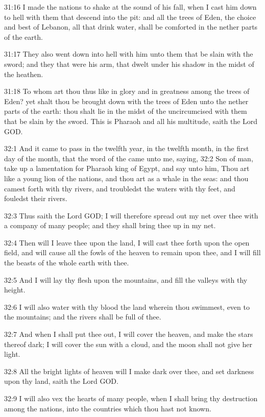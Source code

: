 31:16 I made the nations to shake at the sound of his fall, when I cast him down to hell with them that descend into the pit: and all the trees of Eden, the choice and best of Lebanon, all that drink water, shall be comforted in the nether parts of the earth.

31:17 They also went down into hell with him unto them that be slain with the sword; and they that were his arm, that dwelt under his shadow in the midst of the heathen.

31:18 To whom art thou thus like in glory and in greatness among the trees of Eden? yet shalt thou be brought down with the trees of Eden unto the nether parts of the earth: thou shalt lie in the midst of the uncircumcised with them that be slain by the sword. This is Pharaoh and all his multitude, saith the Lord GOD.

32:1 And it came to pass in the twelfth year, in the twelfth month, in the first day of the month, that the word of the \LORD came unto me, saying, 32:2 Son of man, take up a lamentation for Pharaoh king of Egypt, and say unto him, Thou art like a young lion of the nations, and thou art as a whale in the seas: and thou camest forth with thy rivers, and troubledst the waters with thy feet, and fouledst their rivers.

32:3 Thus saith the Lord GOD; I will therefore spread out my net over thee with a company of many people; and they shall bring thee up in my net.

32:4 Then will I leave thee upon the land, I will cast thee forth upon the open field, and will cause all the fowls of the heaven to remain upon thee, and I will fill the beasts of the whole earth with thee.

32:5 And I will lay thy flesh upon the mountains, and fill the valleys with thy height.

32:6 I will also water with thy blood the land wherein thou swimmest, even to the mountains; and the rivers shall be full of thee.

32:7 And when I shall put thee out, I will cover the heaven, and make the stars thereof dark; I will cover the sun with a cloud, and the moon shall not give her light.

32:8 All the bright lights of heaven will I make dark over thee, and set darkness upon thy land, saith the Lord GOD.

32:9 I will also vex the hearts of many people, when I shall bring thy destruction among the nations, into the countries which thou hast not known.

